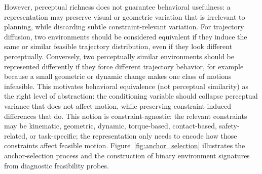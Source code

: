 However, perceptual richness does not guarantee behavioral usefulness: a representation may preserve visual or geometric variation that is irrelevant to planning, while discarding subtle constraint-relevant variation.
For trajectory diffusion, two environments should be considered equivalent if they induce the same or similar feasible trajectory distribution, even if they look different perceptually.
Conversely, two perceptually similar environments should be represented differently if they force different trajectory behavior, for example because a small geometric or dynamic change makes one class of motions infeasible.
This motivates behavioral equivalence (not perceptual similarity) as the right level of abstraction: the conditioning variable should collapse perceptual variance that does not affect motion, while preserving constraint-induced differences that do.
This notion is constraint-agnostic: the relevant constraints may be kinematic, geometric, dynamic, torque-based, contact-based, safety-related, or task-specific; the representation only needs to encode how those constraints affect feasible motion.
Figure~\ref{fig:anchor_selection} illustrates the anchor-selection process and the construction of binary environment signatures from diagnostic feasibility probes.


